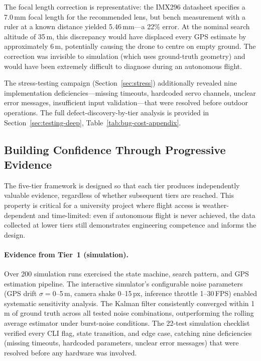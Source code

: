 The focal length correction is representative: the IMX296 datasheet specifies a 7.0\,mm focal length for the recommended lens, but bench measurement with a ruler at a known distance yielded 5.46\,mm---a 22\% error.  At the nominal search altitude of 35\,m, this discrepancy would have displaced every GPS estimate by approximately 6\,m, potentially causing the drone to centre on empty ground.  The correction was invisible to simulation (which uses ground-truth geometry) and would have been extremely difficult to diagnose during an autonomous flight.

The stress-testing campaign (Section~\ref{sec:stress}) additionally revealed nine implementation deficiencies---missing timeouts, hardcoded servo channels, unclear error messages, insufficient input validation---that were resolved before outdoor operations.  The full defect-discovery-by-tier analysis is provided in Section~\ref{sec:testing-deep}, Table~\ref{tab:bug-cost-appendix}.

\subsection{Building Confidence Through Progressive Evidence}\label{sec:confidence-buildup}

The five-tier framework is designed so that each tier produces independently valuable evidence, regardless of whether subsequent tiers are reached.  This property is critical for a university project where flight access is weather-dependent and time-limited: even if autonomous flight is never achieved, the data collected at lower tiers still demonstrates engineering competence and informs the design.

\paragraph{Evidence from Tier~1 (simulation).}
Over 200 simulation runs exercised the state machine, search pattern, and GPS estimation pipeline.  The interactive simulator's configurable noise parameters (GPS drift $\sigma = 0$--5\,m, camera shake 0--15\,px, inference throttle 1--30\,FPS) enabled systematic sensitivity analysis.  The Kalman filter consistently converged within 1\,m of ground truth across all tested noise combinations, outperforming the rolling average estimator under burst-noise conditions.  The 22-test simulation checklist verified every CLI flag, state transition, and edge case, catching nine deficiencies (missing timeouts, hardcoded parameters, unclear error messages) that were resolved before any hardware was involved.

